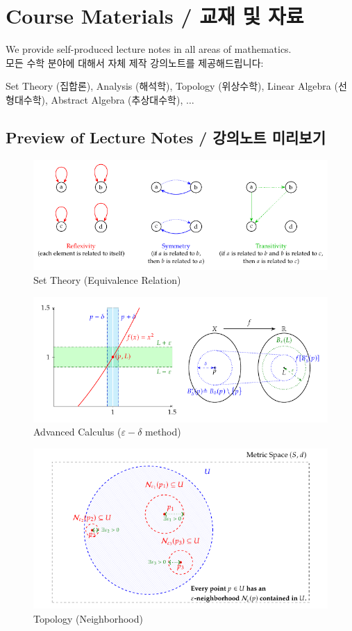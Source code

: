 	\section*{Course Materials / 교재 및 자료}
	We provide self-produced lecture notes in all areas of mathematics.\\
	모든 수학 분야에 대해서 자체 제작 강의노트를 제공해드립니다: \begin{center}
		Set Theory (집합론), Analysis (해석학), Topology (위상수학), Linear Algebra (선형대수학), Abstract Algebra (추상대수학), $\dots$
	\end{center}
	\subsection*{Preview of Lecture Notes / 강의노트 미리보기}
	\begin{figure}[h!]\centering
		\includegraphics[scale=.4]{lecture-note-1}
		\caption{Set Theory (Equivalence Relation)}
	\end{figure}
	
	\begin{figure}[h!]\centering
	\includegraphics[scale=.4]{lecture-note-4}
	\caption{Advanced Calculus ($\varepsilon-\delta$ method)}
	\end{figure}

	\begin{figure}[h!]\centering
	\includegraphics[scale=.4]{lecture-note-3}
	\caption{Topology (Neighborhood)}
	\end{figure}

